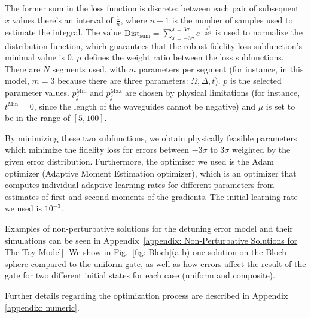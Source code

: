 \documentclass[floatfix,reprint, amsmath,amssymb,aps,superscriptaddress,nofootinbib]{revtex4-2}
\begin{document}
The former sum in the loss function is discrete: between each pair of subsequent $x$ values there's an interval of $\frac{1}{n}$, where $n+1$ is the number of samples used to estimate the integral. The value $\mathrm{Dist}_\mathrm{sum}=\sum_{x=-3 \sigma }^{x=3 \sigma} e^{-\frac{x^2}{2 \sigma^2}}$ is used to normalize the distribution function, which guarantees that the robust fidelity loss subfunction's minimal value is 0.  
$\mu$ defines the weight ratio between the loss subfunctions. There are $N$ segments used, with $m$ parameters per segment (for instance, in this model, $m=3$ because there are three parameters: $ \Omega , \Delta, t$). $p$ is the selected parameter values. $p_{j}^\mathrm{Min}$ and $p_{j}^\mathrm{Max}$ are chosen by physical limitations (for instance, $t^\mathrm{Min}=0$, since the length of the waveguides cannot be negative) and $\mu$ is set to be in the range of $[5,100]$.

By minimizing these two subfunctions, we obtain physically feasible parameters which minimize the fidelity loss for errors between $-3\sigma$ to $3\sigma$ weighted by the given error distribution. Furthermore, the optimizer we used is the Adam  optimizer \cite{kingma2017adam} (Adaptive Moment Estimation optimizer), which is an optimizer that  computes individual adaptive learning rates for different parameters from estimates of first and second moments of the gradients. The initial learning rate we used is $10^{-3}$.

Examples of non-perturbative solutions for the detuning error model and their simulations can be seen in Appendix~\ref{appendix: Non-Perturbative Solutions for The Toy Model}.
We show in Fig.~\ref{fig: Bloch}(a-b) one solution on the Bloch sphere compared to the uniform gate, as well as how errors affect the result of the gate for two different initial states for each case (uniform and composite).

 Further details regarding the optimization process are described in Appendix \ref{appendix: numeric}. 
 
\end{document}
